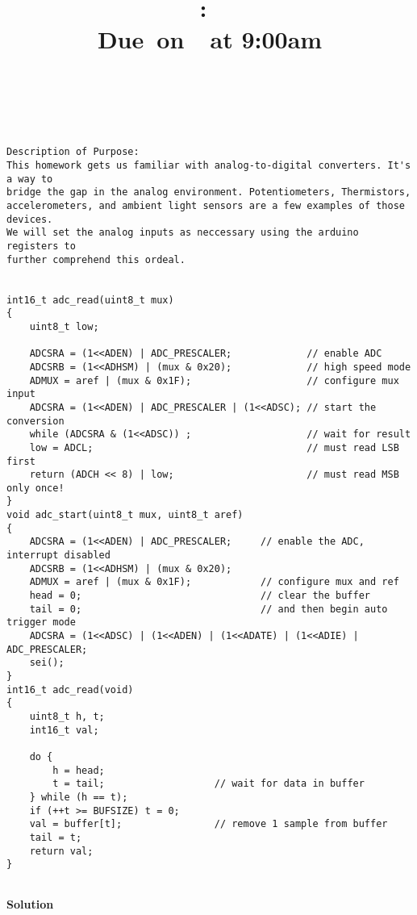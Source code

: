 \documentclass{article}
\title{
    \vspace{2in}
    \textmd{\textbf{\hmwkClass:\ \hmwkTitle}}\\
    \normalsize\vspace{0.1in}\small{Due\ on\ \hmwkDueDate\ at 9:00am}\\
    \vspace{0.1in}\large{\textit{\hmwkClassInstructor\ \hmwkClassTime}}
    \vspace{3in}
}
\author{\hmwkAuthorName}
\date{}
\newcommand{\enterProblemHeader}[1]{
    \nobreak\extramarks{}{Problem \arabic{#1} continued on next page\ldots}\nobreak{}
    \nobreak\extramarks{Problem \arabic{#1} (continued)}{Problem \arabic{#1} continued on next page\ldots}\nobreak{}
}
\newcommand{\exitProblemHeader}[1]{
    \nobreak\extramarks{Problem \arabic{#1} (continued)}{Problem \arabic{#1} continued on next page\ldots}\nobreak{}
    \stepcounter{#1}
    \nobreak\extramarks{Problem \arabic{#1}}{}\nobreak{}
}
\newcounter{partCounter}
\newcounter{homeworkProblemCounter}
\newenvironment{homeworkProblem}[1][-1]{
    \ifnum#1>0
        \setcounter{homeworkProblemCounter}{#1}
    \fi
    \section{Problem \arabic{homeworkProblemCounter}}
    \setcounter{partCounter}{1}
    \enterProblemHeader{homeworkProblemCounter}
}{
    \exitProblemHeader{homeworkProblemCounter}
}
\begin{document}
\maketitle
\pagebreak


\begin{lstlisting}

Description of Purpose:
This homework gets us familiar with analog-to-digital converters. It's a way to
bridge the gap in the analog environment. Potentiometers, Thermistors,
accelerometers, and ambient light sensors are a few examples of those devices.
We will set the analog inputs as neccessary using the arduino registers to
further comprehend this ordeal.


int16_t adc_read(uint8_t mux)
{
    uint8_t low;

    ADCSRA = (1<<ADEN) | ADC_PRESCALER;             // enable ADC
    ADCSRB = (1<<ADHSM) | (mux & 0x20);             // high speed mode
    ADMUX = aref | (mux & 0x1F);                    // configure mux input
    ADCSRA = (1<<ADEN) | ADC_PRESCALER | (1<<ADSC); // start the conversion
    while (ADCSRA & (1<<ADSC)) ;                    // wait for result
    low = ADCL;                                     // must read LSB first
    return (ADCH << 8) | low;                       // must read MSB only once!
}
void adc_start(uint8_t mux, uint8_t aref)
{
    ADCSRA = (1<<ADEN) | ADC_PRESCALER;     // enable the ADC, interrupt disabled
    ADCSRB = (1<<ADHSM) | (mux & 0x20);
    ADMUX = aref | (mux & 0x1F);            // configure mux and ref
    head = 0;                               // clear the buffer
    tail = 0;                               // and then begin auto trigger mode
    ADCSRA = (1<<ADSC) | (1<<ADEN) | (1<<ADATE) | (1<<ADIE) | ADC_PRESCALER;
    sei();
}
int16_t adc_read(void)
{
    uint8_t h, t;
    int16_t val;

    do {
        h = head;
        t = tail;                   // wait for data in buffer
    } while (h == t);
    if (++t >= BUFSIZE) t = 0;
    val = buffer[t];                // remove 1 sample from buffer
    tail = t;
    return val;
}


\end{lstlisting}

  \textbf{Solution}
\end{document}
